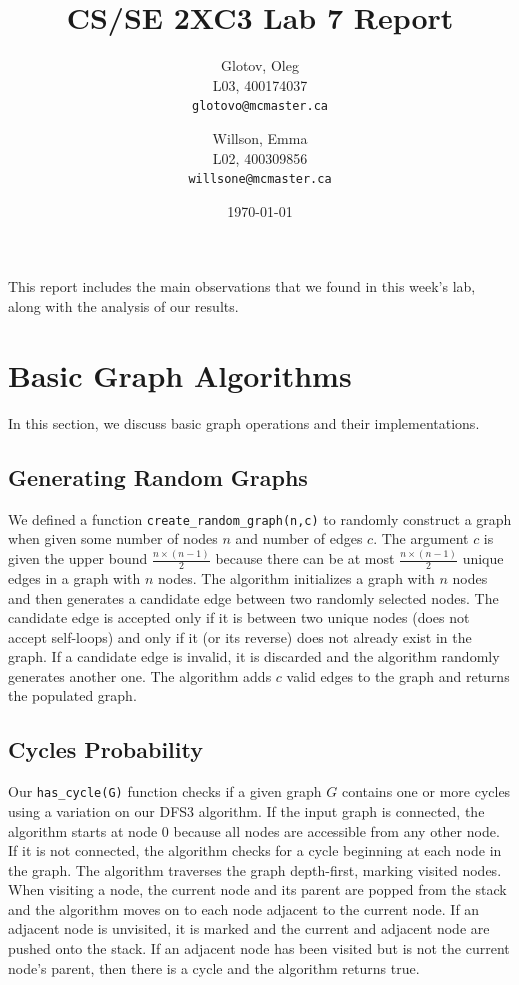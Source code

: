 \documentclass[12pt]{article}
\title{CS/SE 2XC3 Lab 7 Report}
\author{
  Glotov, Oleg\\ L03, 400174037\\
  \texttt{glotovo@mcmaster.ca}
  \and
  Willson, Emma\\ L02, 400309856\\
  \texttt{willsone@mcmaster.ca}
  }
\date{\today}
\begin{document}
\maketitle

This report includes the main observations that we found in this week's lab, along with the analysis of our results.

\newpage 
\section{Basic Graph Algorithms}
In this section, we discuss basic graph operations and their implementations. 
\subsection{Generating Random Graphs}
We defined a function \verb+create_random_graph(n,c)+ to randomly construct a graph when given some number of nodes $n$ and number of edges $c$. The argument $c$ is given the upper bound $\frac{n\times(n-1)}{2}$ because there can be at most $\frac{n\times(n-1)}{2}$ unique edges in a graph with $n$ nodes. The algorithm initializes a graph with $n$ nodes and then generates a candidate edge between two randomly selected nodes. The candidate edge is accepted only if it is between two unique nodes (does not accept self-loops) and only if it (or its reverse) does not already exist in the graph. If a candidate edge is invalid, it is discarded and the algorithm randomly generates another one. The algorithm adds $c$ valid edges to the graph and returns the populated graph.
\subsection{Cycles Probability}
Our \verb+has_cycle(G)+ function checks if a given graph $G$ contains one or more cycles using a variation on our DFS3 algorithm. If the input graph is connected, the algorithm starts at node $0$ because all nodes are accessible from any other node. If it is not connected, the algorithm checks for a cycle beginning at each node in the graph. The algorithm traverses the graph depth-first, marking visited nodes. When visiting a node, the current node and its parent are popped from the stack and the algorithm moves on to each node adjacent to the current node. If an adjacent node is unvisited, it is marked and the current and adjacent node are pushed onto the stack. If an adjacent node has been visited but is not the current node's parent, then there is a cycle and the algorithm returns true.
\end{document}
